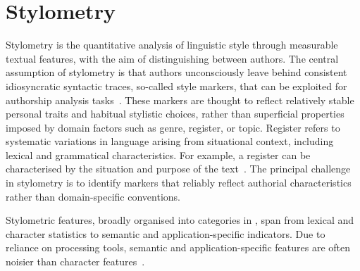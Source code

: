 \section{Stylometry}
\label{sec:stylometry}

Stylometry is the quantitative analysis of linguistic style through measurable textual features, with the aim of distinguishing between authors.
The central assumption of stylometry is that authors unconsciously leave behind consistent idiosyncratic syntactic traces, so-called style markers, that can be exploited for authorship analysis tasks~\citep{neal_surveying_2018}. 
These markers are thought to reflect relatively stable personal traits and habitual stylistic choices, rather than superficial properties imposed by domain factors such as genre, register, or topic.
Register refers to systematic variations in language arising from situational context, including lexical and grammatical characteristics.
For example, a register can be characterised by the situation and purpose of the text~\citep{register_2025,register_2019}. 
The principal challenge in stylometry is to identify markers that reliably reflect authorial characteristics rather than domain-specific conventions.

Stylometric features, broadly organised into categories in , span from lexical and character statistics to semantic and application-specific indicators.
Due to reliance on processing tools, semantic and application-specific features are often noisier than character features~\citep{stamatatos_survey_2009}.



